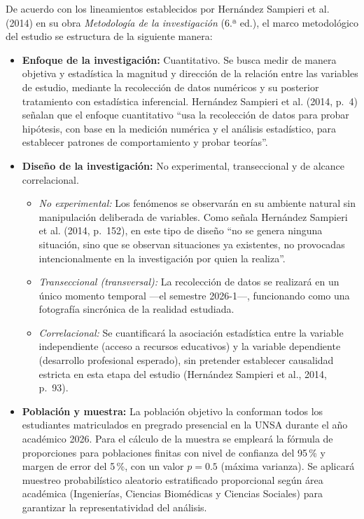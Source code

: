 \documentclass[11pt, a4paper]{article}
\begin{document}
De acuerdo con los lineamientos establecidos por Hernández Sampieri et al. (2014) en su obra \textit{Metodología de la investigación} (6.ª ed.), el marco metodológico del estudio se estructura de la siguiente manera:

\begin{itemize}
    \item \textbf{Enfoque de la investigación:} Cuantitativo. Se busca medir de manera objetiva y estadística la magnitud y dirección de la relación entre las variables de estudio, mediante la recolección de datos numéricos y su posterior tratamiento con estadística inferencial. Hernández Sampieri et al. (2014, p.~4) señalan que el enfoque cuantitativo ``usa la recolección de datos para probar hipótesis, con base en la medición numérica y el análisis estadístico, para establecer patrones de comportamiento y probar teorías''.

    \item \textbf{Diseño de la investigación:} No experimental, transeccional y de alcance correlacional.
    \begin{itemize}
        \item \textit{No experimental:} Los fenómenos se observarán en su ambiente natural sin manipulación deliberada de variables. Como señala Hernández Sampieri et al. (2014, p.~152), en este tipo de diseño ``no se genera ninguna situación, sino que se observan situaciones ya existentes, no provocadas intencionalmente en la investigación por quien la realiza''.
        \item \textit{Transeccional (transversal):} La recolección de datos se realizará en un único momento temporal —el semestre 2026-1—, funcionando como una fotografía sincrónica de la realidad estudiada.
        \item \textit{Correlacional:} Se cuantificará la asociación estadística entre la variable independiente (acceso a recursos educativos) y la variable dependiente (desarrollo profesional esperado), sin pretender establecer causalidad estricta en esta etapa del estudio (Hernández Sampieri et al., 2014, p.~93).
    \end{itemize}

    \item \textbf{Población y muestra:} La población objetivo la conforman todos los estudiantes matriculados en pregrado presencial en la UNSA durante el año académico 2026. Para el cálculo de la muestra se empleará la fórmula de proporciones para poblaciones finitas con nivel de confianza del 95\,\% y margen de error del 5\,\%, con un valor $p=0.5$ (máxima varianza). Se aplicará muestreo probabilístico aleatorio estratificado proporcional según área académica (Ingenierías, Ciencias Biomédicas y Ciencias Sociales) para garantizar la representatividad del análisis.


\end{itemize}
\end{document}
